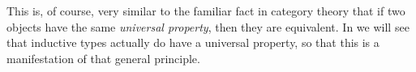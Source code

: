 \documentclass[12pt]{article}
\begin{document}
This is, of course, very similar to the familiar fact in category theory that if two objects have the same \emph{universal property}, then they are equivalent.
In  we will see that inductive types actually do have a universal property, so that this is a manifestation of that general principle.
\end{document}
